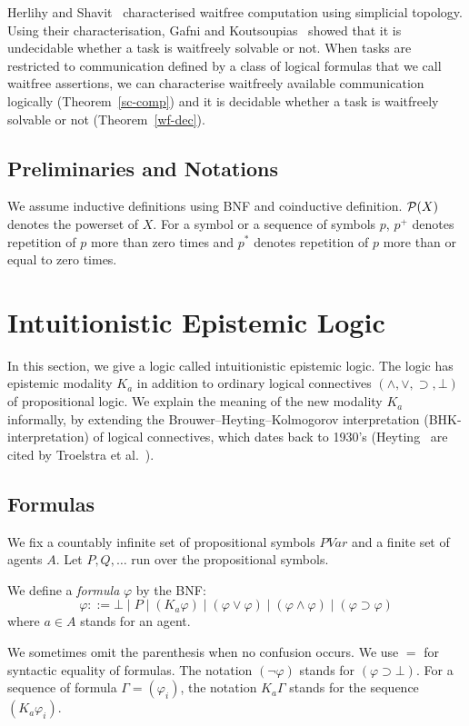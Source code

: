 Herlihy and Shavit~\cite{herlihy1999topological} characterised waitfree computation using
simplicial topology.
Using their characterisation,
Gafni and Koutsoupias~\cite{gafni1999three}
 showed that it is undecidable whether a task is waitfreely solvable
 or not.
When tasks are restricted to communication defined by 
a class of logical formulas that we call waitfree assertions,
we can characterise waitfreely available communication logically (Theorem~\ref{sc-comp})
and 
it is decidable whether a task is waitfreely solvable or not (Theorem~\ref{wf-dec}).

\subsection{Preliminaries and Notations}

We assume inductive definitions using BNF and coinductive definition.
${\mathcal P({X})}$ denotes the powerset of $X$.
For a symbol or a sequence of symbols $p$, 
$p^+$ denotes repetition of $p$ more than zero times and
$p^*$ denotes repetition of $p$ more than or equal to zero times.

\section{Intuitionistic Epistemic Logic}
\label{iec}

In this section, we give a logic called intuitionistic epistemic logic.
The logic has epistemic modality $K_a$ in addition to ordinary logical connectives
$(\wedge, \vee, \supset, \bot)$ of propositional logic.
We explain the meaning of the new modality $K_a$ informally, by extending 
the Brouwer--Heyting--Kolmogorov interpretation (BHK-interpretation) of logical
connectives, which dates back to 1930's
 (Heyting~\cite{heyting1930formalen, heyting1931intuitionistische}
 are cited by Troelstra et al.~\cite{troelstra1988constructivism}).

\subsection{Formulas}

We fix a countably infinite set of propositional symbols
$PVar$ and a finite set of agents $A$.
Let $P, Q, \ldots$ run over the propositional symbols.

\begin{definition}
\label{formula}
 We define a \textit{formula} $\varphi$ by the BNF:
\[
 \varphi ::= \bot\mid P\mid
 (K_a\varphi)\mid(\varphi\vee\varphi)\mid(\varphi\wedge\varphi)\mid
 (\varphi\supset\varphi)
\]
where $a\in A$ stands for an agent.
\end{definition}
We sometimes omit the parenthesis when no confusion occurs. We use $=$ for syntactic
equality of formulas. 
The notation $(\neg \varphi)$ stands for $(\varphi\supset \bot)$.
For a sequence of formula $\Gamma = (\varphi_i)$, the notation $K_a \Gamma$ stands for
the sequence $(K_a \varphi_i)$.


